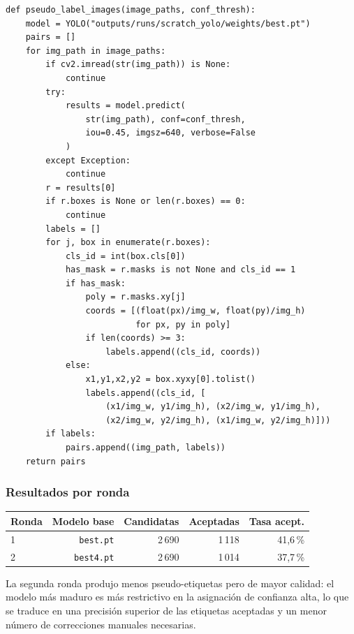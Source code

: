\documentclass[12pt,a4paper]{article}
\begin{document}
\begin{lstlisting}[caption={Núcleo del algoritmo de pseudo-labeling (\texttt{scripts/pseudo\_label.py})}]
def pseudo_label_images(image_paths, conf_thresh):
    model = YOLO("outputs/runs/scratch_yolo/weights/best.pt")
    pairs = []
    for img_path in image_paths:
        if cv2.imread(str(img_path)) is None:
            continue
        try:
            results = model.predict(
                str(img_path), conf=conf_thresh,
                iou=0.45, imgsz=640, verbose=False
            )
        except Exception:
            continue
        r = results[0]
        if r.boxes is None or len(r.boxes) == 0:
            continue
        labels = []
        for j, box in enumerate(r.boxes):
            cls_id = int(box.cls[0])
            has_mask = r.masks is not None and cls_id == 1
            if has_mask:
                poly = r.masks.xy[j]
                coords = [(float(px)/img_w, float(py)/img_h)
                          for px, py in poly]
                if len(coords) >= 3:
                    labels.append((cls_id, coords))
            else:
                x1,y1,x2,y2 = box.xyxy[0].tolist()
                labels.append((cls_id, [
                    (x1/img_w, y1/img_h), (x2/img_w, y1/img_h),
                    (x2/img_w, y2/img_h), (x1/img_w, y2/img_h)]))
        if labels:
            pairs.append((img_path, labels))
    return pairs
\end{lstlisting}

\subsubsection{Resultados por ronda}

\begin{center}
\begin{tabular}{lrrrr}
  \toprule
  \textbf{Ronda} & \textbf{Modelo base} & \textbf{Candidatas} & \textbf{Aceptadas} & \textbf{Tasa acept.} \\
  \midrule
  1 & \texttt{best.pt}  & 2\,690 & 1\,118 & 41,6\,\% \\
  2 & \texttt{best4.pt} & 2\,690 & 1\,014 & 37,7\,\% \\
  \bottomrule
\end{tabular}
\end{center}

La segunda ronda produjo menos pseudo-etiquetas pero de mayor calidad: el modelo más
maduro es más restrictivo en la asignación de confianza alta, lo que se traduce en una
precisión superior de las etiquetas aceptadas y un menor número de correcciones manuales
necesarias.
\end{document}
